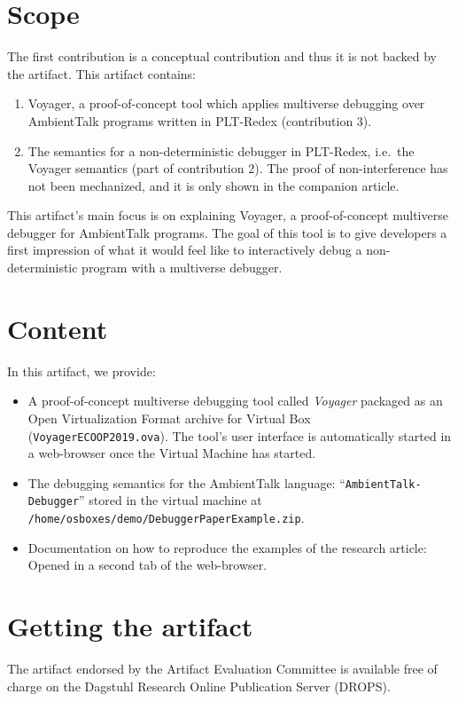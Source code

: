 \documentclass[a4paper,UKenglish]{darts-v2019}
\newenvironment{scope}{\section{Scope}}{}
\newenvironment{content}{\section{Content}}{}
\newenvironment{getting}{\section{Getting the artifact} The artifact 
endorsed by the Artifact Evaluation Committee is available free of 
charge on the Dagstuhl Research Online Publication Server (DROPS).}{}
\begin{document}
\begin{scope}
The first contribution is a conceptual contribution and thus it is not
backed by the artifact. This artifact contains:

\begin{enumerate}
	\item
	Voyager, a proof-of-concept tool which applies multiverse debugging
	over AmbientTalk programs written in PLT-Redex (contribution 3).
	\item
	The semantics for a non-deterministic debugger in PLT-Redex, i.e.~the
	Voyager semantics (part of contribution 2). The proof of
	non-interference has not been mechanized, and it is only shown in the
	companion article.
\end{enumerate}

This artifact's main focus is on explaining Voyager, a proof-of-concept
multiverse debugger for AmbientTalk programs. The goal of this tool is
to give developers a first impression of what it would feel like to
interactively debug a non-deterministic program with a multiverse
debugger.
\end{scope}
\newpage
\begin{content}
In this artifact, we provide:

\begin{itemize}
	\item
	A proof-of-concept multiverse debugging tool called \emph{Voyager}
	packaged as an Open Virtualization Format archive for Virtual Box
	(\texttt{VoyagerECOOP2019.ova}). The tool's user interface is automatically started in a web-browser once the Virtual Machine has started.
	\item
	The debugging semantics for the AmbientTalk language:
	``\texttt{AmbientTalk-Debugger}'' stored in the virtual machine at
	\texttt{/home/osboxes/demo/DebuggerPaperExample.zip}.
	\item Documentation on how to reproduce the examples of the research article: Opened in a second tab of the web-browser.
\end{itemize}
\end{content}

\begin{getting}
\end{getting}
\end{document}
